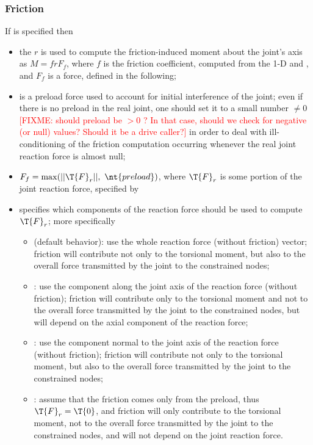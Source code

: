 \subsubsection{Friction}
If  is specified then
\begin{itemize}
\item the  $r$ is used to compute the friction-induced moment about the joint's axis as $M = frF_f$, where $f$ is the friction coefficient, computed from the 1-D  and , and $F_f$ is a force, defined in the following;
\item {} is a preload force used to account for initial interference of the joint; even if there is no preload
in the real joint, one should set it to a small number $\neq 0$ \textcolor{red}{[FIXME: should preload be $ > 0$ ? In that case, should we check for negative (or null) values? Should it be a drive caller?]} in order to deal with ill-conditioning of the friction computation occurring whenever the real joint reaction force is almost null;
\item $F_f=\max(||\T{F}_r||,\ \nt{preload})$, where $\T{F}_r$ is some portion of the joint reaction force, %
specified by 
\item {} specifies which components of the reaction force should be used to compute $\T{F}_r$; more specifically
    \begin{itemize}
        \item {} (default behavior): use the whole reaction force (without friction) vector; friction will contribute not only to the torsional moment, but also to the overall force transmitted by the joint to the constrained nodes;
        \item {}: use the component along the joint axis of the reaction force (without friction); friction will contribute only to the torsional moment and not to the overall force transmitted by the joint to the constrained nodes, but will depend on the axial component of the reaction force;
        \item {}: use the component normal to the joint axis of the reaction force (without friction); friction will contribute not only to the torsional moment, but also to the overall force transmitted by the joint to the constrained nodes;
        \item {}: assume that the friction comes only from the preload, thus $\T{F}_r=\T{0}$, and friction will only contribute to the torsional moment, not to the overall force transmitted by the joint to the constrained nodes, and will not depend on the joint reaction force.
    \end{itemize}

\end{itemize}

